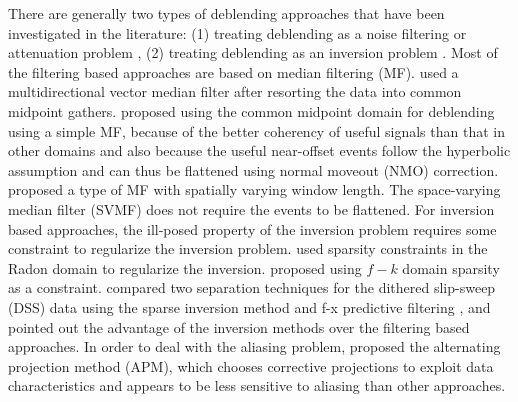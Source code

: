 There are generally two types of deblending approaches that have been investigated in the literature: (1) treating deblending as a noise filtering or attenuation problem \cite{mediandeblend,yangkang2014nmo,yangkang2014svmf,qushan2015}, (2) treating deblending as an inversion problem \cite{abma2010,yangkang20142,jinkun2015}.  %
Most of the filtering based approaches are based on median filtering (MF). \cite{mediandeblend} used a multidirectional vector median filter  after resorting the data into common midpoint gathers. \cite{yangkang2014nmo} proposed using the common midpoint domain for deblending using a simple MF, because of the better coherency of useful signals than that in other domains and also because the useful near-offset events follow the hyperbolic assumption and can thus be flattened using normal moveout (NMO) correction.  \cite{yangkang2014svmf} proposed a type of MF with spatially varying window length. The space-varying median filter (SVMF) does not require the events to be flattened.  For inversion based approaches, the ill-posed property of the inversion problem requires some constraint to regularize the inversion problem.  \cite{akerberg2008} used sparsity constraints in the Radon domain to regularize the inversion. \cite{abma2010} proposed using $f-k$ domain sparsity as a constraint.  \cite{bagaini2012} compared two separation techniques for the dithered slip-sweep (DSS) data using the sparse inversion method and f-x predictive filtering \cite{canales,yangkang2014,shuwei2015}, and pointed out the advantage of the inversion methods over the filtering based approaches. In order to deal with the aliasing problem, \cite{proj} proposed the alternating projection method (APM), which chooses corrective projections to exploit data characteristics and appears to be less sensitive to aliasing than other approaches. %

